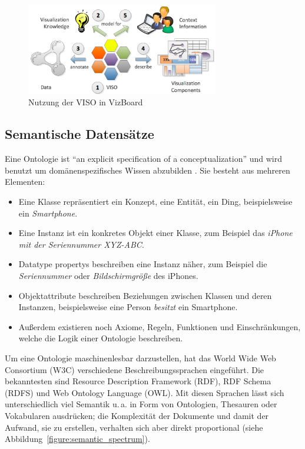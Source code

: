 \documentclass[
	headsepline,
	footsepline,
	fontsize=12pt,
	bibliography=totoc
]{scrbook}
\begin{document}
\begin{figure}[htbp]
	\centering
	\includegraphics[width=0.75\textwidth]{images/grundlagen-viso.png}
	\caption{Nutzung der VISO in VizBoard}
	\label{figure:viso}
\end{figure}

\subsection{Semantische Datensätze}
\label{section:standderforschung:grundlagen:semantische_daten}

Eine Ontologie ist \enquote{an explicit specification of a conceptualization} \cite{Gruber1995} und wird benutzt um domänenspezifisches Wissen abzubilden \cite{Chandrasekaran1999}. Sie besteht aus mehreren Elementen:

\begin{itemize}
	\item Eine Klasse repräsentiert ein Konzept, eine Entität, ein Ding, beispielsweise ein \textit{Smartphone}.
	\item Eine Instanz ist ein konkretes Objekt einer Klasse, zum Beispiel das \textit{iPhone mit der Seriennummer XYZ-ABC}.
	\item Datatype propertys beschreiben eine Instanz näher, zum Beispiel die \textit{Seriennummer} oder \textit{Bildschirmgröße} des iPhones.
	\item Objektattribute beschreiben Beziehungen zwischen Klassen und deren Instanzen, beispielsweise eine Person \textit{besitzt} ein Smartphone.
	\item Außerdem existieren noch Axiome, Regeln, Funktionen und Einschränkungen, welche die Logik einer Ontologie beschreiben.
\end{itemize}

Um eine Ontologie maschinenlesbar darzustellen, hat das World Wide Web Consortium (W3C) verschiedene Beschreibungssprachen eingeführt. Die bekanntesten sind Resource Description Framework (RDF), RDF Schema (RDFS) und Web Ontology Language (OWL). Mit diesen Sprachen lässt sich unterschiedlich viel Semantik u.\,a. in Form von Ontologien, Thesauren oder Vokabularen ausdrücken; die Komplexität der Dokumente und damit der Aufwand, sie zu erstellen, verhalten sich aber direkt proportional (siehe Abbildung~\ref{figure:semantic_spectrum}).
\end{document}
